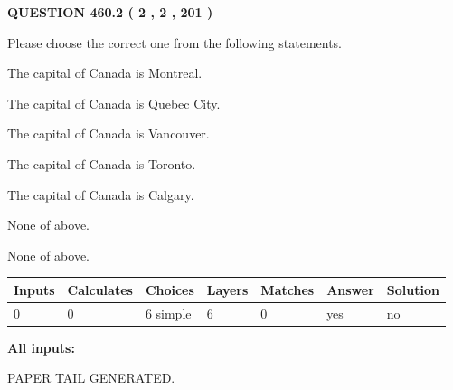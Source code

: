 \documentclass[12pt]{article}
\begin{document}
\vspace{0.2in}
  
{\textbf{\Large{QUESTION
460.2 
 ( 2 , 2 , 201 )
}}}
  
  
Please choose the correct one from the following statements.
 
 
The capital of Canada is Montreal.
 
 
The capital of Canada is Quebec City.
 
 
The capital of Canada is Vancouver.
 
 
The capital of Canada is Toronto.
 
 
The capital of Canada is Calgary.
 
 
 None of above.
 
 
\noindent{}
 
 
 None of above.
 
 
\noindent{}
 
 
   
   
   
   
\noindent\begin{tabular}{|l|l|l|l|l|l|l|}
 \hline
Inputs & Calculates & Choices & Layers & Matches & Answer & Solution \\ \hline
 0  & 
 0  & 
 6
  simple  
  & 
 6  & 
 0  & 
  yes & 
  no 
  \\ \hline
 \end{tabular}
   
   
   
   
\noindent{}
   
   
   
   
\noindent\vspace{0.1in}\hspace{-0.08in} {\textbf{\Large{All inputs: }}}
   
   
   
   
   
   
 \vspace{0.2in}
 
   
   
\vspace{2.0in} PAPER TAIL GENERATED.
   
\end{document}

